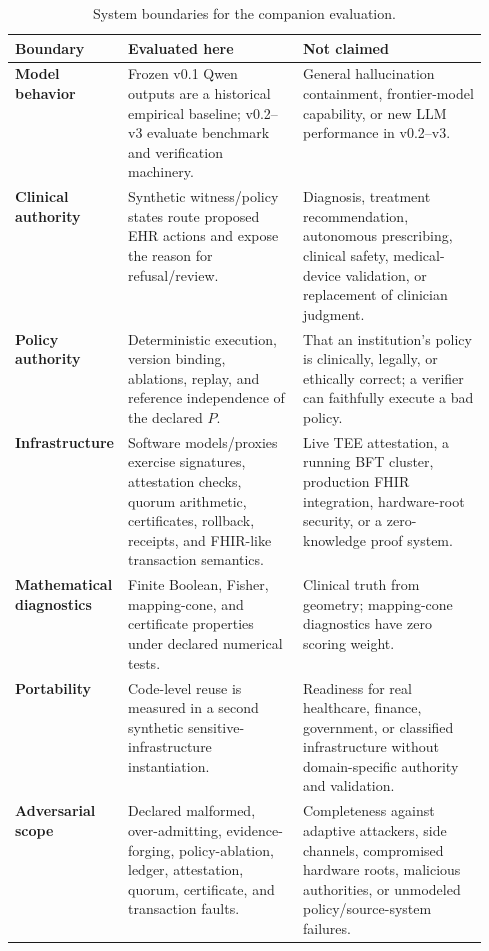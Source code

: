 \documentclass[11pt]{article}
\begin{document}
\begin{table}[H]
\centering
\small
\caption{System boundaries for the companion evaluation.}
\label{tab:system-boundaries}
\begin{tabularx}{\linewidth}{>{\bfseries\RaggedRight\arraybackslash}p{0.18\linewidth} >{\RaggedRight\arraybackslash}p{0.37\linewidth} >{\RaggedRight\arraybackslash}X}
\toprule
Boundary & Evaluated here & Not claimed\\
\midrule
Model behavior & Frozen v0.1 Qwen outputs are a historical empirical baseline; v0.2--v3 evaluate benchmark and verification machinery. & General hallucination containment, frontier-model capability, or new LLM performance in v0.2--v3.\\
Clinical authority & Synthetic witness/policy states route proposed EHR actions and expose the reason for refusal/review. & Diagnosis, treatment recommendation, autonomous prescribing, clinical safety, medical-device validation, or replacement of clinician judgment.\\
Policy authority & Deterministic execution, version binding, ablations, replay, and reference independence of the declared \(P\). & That an institution's policy is clinically, legally, or ethically correct; a verifier can faithfully execute a bad policy.\\
Infrastructure & Software models/proxies exercise signatures, attestation checks, quorum arithmetic, certificates, rollback, receipts, and FHIR-like transaction semantics. & Live TEE attestation, a running BFT cluster, production FHIR integration, hardware-root security, or a zero-knowledge proof system.\\
Mathematical diagnostics & Finite Boolean, Fisher, mapping-cone, and certificate properties under declared numerical tests. & Clinical truth from geometry; mapping-cone diagnostics have zero scoring weight.\\
Portability & Code-level reuse is measured in a second synthetic sensitive-infrastructure instantiation. & Readiness for real healthcare, finance, government, or classified infrastructure without domain-specific authority and validation.\\
Adversarial scope & Declared malformed, over-admitting, evidence-forging, policy-ablation, ledger, attestation, quorum, certificate, and transaction faults. & Completeness against adaptive attackers, side channels, compromised hardware roots, malicious authorities, or unmodeled policy/source-system failures.\\
\bottomrule
\end{tabularx}
\end{table}
\end{document}
